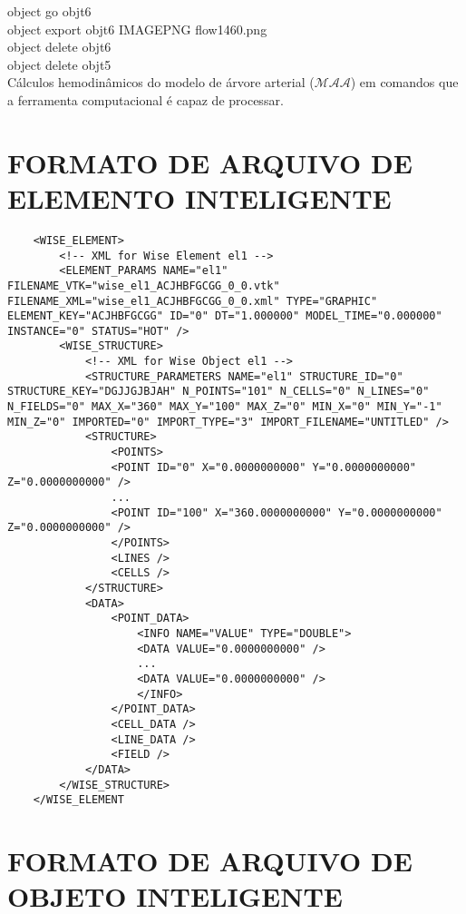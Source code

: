 \begin{appendices}
\begin{algorithm}[H]
		object go obj\underline{\space\space}t6 \\
		object export obj\underline{\space\space}t6 IMAGE\underline{\space\space}PNG flow\underline{\space\space}14\underline{\space\space}60.png \\
		object delete obj\underline{\space\space}t6 \\
		object delete obj\underline{\space\space}t5 \\
		\caption{Cálculos hemodinâmicos do modelo de árvore arterial ($\mathcal{MAA}$) em comandos que a ferramenta computacional é capaz de processar.}
	\end{algorithm}
	
	\chapter{FORMATO DE ARQUIVO DE ELEMENTO INTELIGENTE}\label{annex3}
	
	\lstset{language=XML}
	\begin{lstlisting}
	<WISE_ELEMENT>
		<!-- XML for Wise Element el1 -->
		<ELEMENT_PARAMS NAME="el1" FILENAME_VTK="wise_el1_ACJHBFGCGG_0_0.vtk" FILENAME_XML="wise_el1_ACJHBFGCGG_0_0.xml" TYPE="GRAPHIC" ELEMENT_KEY="ACJHBFGCGG" ID="0" DT="1.000000" MODEL_TIME="0.000000" INSTANCE="0" STATUS="HOT" />
		<WISE_STRUCTURE>
			<!-- XML for Wise Object el1 -->
			<STRUCTURE_PARAMETERS NAME="el1" STRUCTURE_ID="0" STRUCTURE_KEY="DGJJGJBJAH" N_POINTS="101" N_CELLS="0" N_LINES="0" N_FIELDS="0" MAX_X="360" MAX_Y="100" MAX_Z="0" MIN_X="0" MIN_Y="-1" MIN_Z="0" IMPORTED="0" IMPORT_TYPE="3" IMPORT_FILENAME="UNTITLED" />
			<STRUCTURE>
				<POINTS>
				<POINT ID="0" X="0.0000000000" Y="0.0000000000" Z="0.0000000000" />
				...
				<POINT ID="100" X="360.0000000000" Y="0.0000000000" Z="0.0000000000" />
				</POINTS>
				<LINES />
				<CELLS />
			</STRUCTURE>
			<DATA>
				<POINT_DATA>
					<INFO NAME="VALUE" TYPE="DOUBLE">
					<DATA VALUE="0.0000000000" />
					...
					<DATA VALUE="0.0000000000" />
					</INFO>
				</POINT_DATA>
				<CELL_DATA />
				<LINE_DATA />
				<FIELD />
			</DATA>
		</WISE_STRUCTURE>
	</WISE_ELEMENT
	\end{lstlisting}
	
	\chapter{FORMATO DE ARQUIVO DE OBJETO INTELIGENTE}\label{annex4}
	

\end{appendices}
